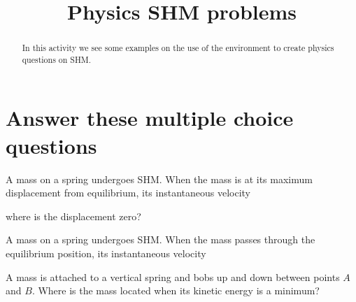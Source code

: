 \documentclass{ximera}
\title{Physics SHM problems }
\begin{document}
\begin{abstract}
In this activity we see some examples on the use of the environment to create physics questions on SHM.
\end{abstract}
\maketitle

\section{Answer these multiple choice questions}

\begin{interactive}[interactiveContent.js]
\begin{question}
A mass on a spring undergoes SHM. When the mass is at its maximum displacement from equilibrium, its instantaneous velocity
\begin{solution}
\begin{multiple-choice}
\end{multiple-choice}
\begin{hint}
where is the displacement zero?
\end{hint}
\end{solution}
\end{question}

\begin{question}
A mass on a spring undergoes SHM. When the mass passes through the equilibrium position, its instantaneous velocity
\begin{solution}
\begin{multiple-choice}
\end{multiple-choice}
\end{solution}
\end{question}

\begin{question}
A mass is attached to a vertical spring and bobs up and down between points $A$ and $B$. Where is the mass located when its kinetic
energy is a minimum?
\begin{solution}
\begin{multiple-choice}
\end{multiple-choice}
\end{solution}
\end{question}


\end{interactive}
\end{document}

